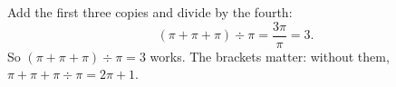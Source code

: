 Add the first three copies and divide by the fourth:
\[(\pi+\pi+\pi)\div\pi=\dfrac{3\pi}{\pi}=3.\]
So $\boxed{(\pi+\pi+\pi)\div\pi=3}$ works. The brackets matter: without them, $\pi+\pi+\pi\div\pi=2\pi+1$.
